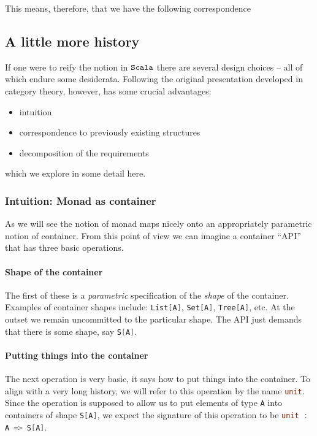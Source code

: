 This means, therefore, that we have the following correspondence


\subsection{A little more history}

If one were to reify the notion in $\texttt{Scala}$ there are several design
choices -- all of which endure some desiderata. Following the original
presentation developed in category theory, however, has some crucial
advantages:

\begin{itemize}
  \item intuition
  \item correspondence to previously existing structures
  \item decomposition of the requirements 
\end{itemize}

which we explore in some detail here.

\subsubsection{Intuition: Monad as container}

As we will see the notion of monad maps nicely onto an appropriately
parametric notion of container. From this point of view we can imagine
a container ``API'' that has three basic operations. 
\paragraph{Shape of the container} The first of these is a
\emph{parametric} specification of the \emph{shape} of the
container. Examples of container shapes include: \lstinline[language=Scala]!List[A]!,
\lstinline[language=Scala]!Set[A]!, \lstinline[language=Scala]!Tree[A]!, etc. At the outset we remain
uncommitted to the particular shape. The API just demands that
there is some shape, say \lstinline[language=Scala]!S[A]!.
\paragraph{Putting things into the container} The next operation is
very basic, it says how to put things into the container. To align
with a very long history, we will refer to this operation by the name
\lstinline[language=Scala]!unit!. Since the operation is supposed to allow us to put
elements of type \lstinline[language=Scala]!A! into containers of shape \lstinline[language=Scala]!S[A]!, we
expect the signature of this operation to be \lstinline[language=Scala]!unit : A => S[A]!.
